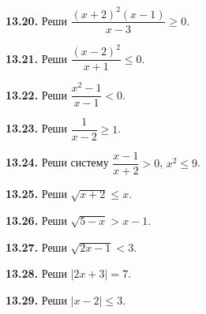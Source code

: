 \noindent\begin{minipage}[t]{\linewidth}\textbf{13.20.} Реши \(\dfrac{(x+2)^2(x-1)}{x-3}\geq0\).\par\end{minipage}\par
\noindent\begin{minipage}[t]{\linewidth}\textbf{13.21.}\starmark{} Реши \(\dfrac{(x-2)^2}{x+1}\leq0\).\par\end{minipage}\par
\noindent\begin{minipage}[t]{\linewidth}\textbf{13.22.} Реши \(\dfrac{x^2-1}{x-1}<0\).\par\end{minipage}\par
\noindent\begin{minipage}[t]{\linewidth}\textbf{13.23.} Реши \(\dfrac1{x-2}\geq1\).\par\end{minipage}\par
\noindent\begin{minipage}[t]{\linewidth}\textbf{13.24.}\starmark{} Реши систему \(\dfrac{x-1}{x+2}>0\), \(x^2\leq9\).\par\end{minipage}\par
\noindent\begin{minipage}[t]{\linewidth}\textbf{13.25.} Реши \(\sqrt{x+2}\leq x\).\par\end{minipage}\par
\noindent\begin{minipage}[t]{\linewidth}\textbf{13.26.}\starmark{} Реши \(\sqrt{5-x}>x-1\).\par\end{minipage}\par
\noindent\begin{minipage}[t]{\linewidth}\textbf{13.27.} Реши \(\sqrt{2x-1}<3\).\par\end{minipage}\par
\noindent\begin{minipage}[t]{\linewidth}\textbf{13.28.} Реши \(|2x+3|=7\).\par\end{minipage}\par
\noindent\begin{minipage}[t]{\linewidth}\textbf{13.29.} Реши \(|x-2|\leq3\).\par\end{minipage}\par
